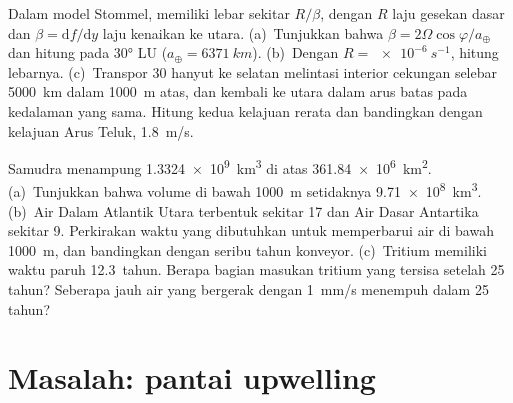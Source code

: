 \begin{exercise}[$\star\star\star$]\label{exo:b1:ocean-circulation:11}
Dalam model Stommel,  memiliki lebar sekitar $R/\beta$, dengan $R$ laju gesekan dasar dan $\beta = \mathrm df/\mathrm dy$ laju kenaikan  ke utara. (a)~Tunjukkan bahwa $\beta = 2\Omega
\cos\varphi/a_\oplus$ dan hitung pada \ang{30} LU ($a_\oplus = \qty{6371}{km}$). (b)~Dengan $R = \qty{e-6}{s^{-1}}$, hitung lebarnya. (c)~Transpor \qty{30}{\sverdrup} hanyut ke selatan melintasi interior cekungan selebar \qty{5000}{km} dalam \qty{1000}{m} atas, dan kembali ke utara dalam arus batas pada kedalaman yang sama. Hitung kedua kelajuan rerata dan bandingkan dengan kelajuan Arus Teluk, \qty{1.8}{m/s}.
\end{exercise}

\begin{exercise}[$\star\star\star$]\label{exo:b1:ocean-circulation:12}
Samudra menampung \qty{1.3324e9}{km^3} di atas \qty{361.84e6}{km^2}. (a)~Tunjukkan bahwa volume di bawah \qty{1000}{m} setidaknya \qty{9.71e8}{km^3}. (b)~Air Dalam Atlantik Utara terbentuk sekitar \qty{17}{\sverdrup} dan Air Dasar Antartika sekitar \qty{9}{\sverdrup}. Perkirakan waktu yang dibutuhkan untuk memperbarui air di bawah \qty{1000}{m}, dan bandingkan dengan seribu tahun konveyor. (c)~Tritium memiliki waktu paruh \qty{12.3}{tahun}. Berapa bagian masukan tritium yang tersisa setelah 25 tahun? Seberapa jauh air yang bergerak dengan \qty{1}{mm/s} menempuh dalam 25 tahun?
\end{exercise}

\section{Masalah: pantai upwelling}


